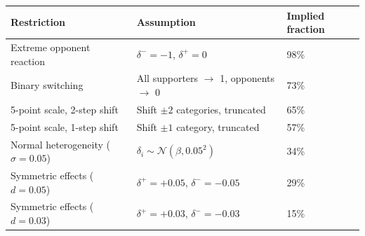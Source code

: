 \begin{tabular}{lll}
\toprule
Restriction & Assumption & Implied fraction \\
\midrule
Extreme opponent reaction & $\delta^- = -1$, $\delta^+ = 0$ & 98\% \\
Binary switching & All supporters $\to$ 1, opponents $\to$ 0 & 73\% \\
5-point scale, 2-step shift & Shift $\pm 2$ categories, truncated & 65\% \\
5-point scale, 1-step shift & Shift $\pm 1$ category, truncated & 57\% \\
Normal heterogeneity ($\sigma = 0.05$) & $\delta_i \sim \mathcal{N}(\beta, 0.05^2)$ & 34\% \\
Symmetric effects ($d = 0.05$) & $\delta^+ = +0.05$, $\delta^- = -0.05$ & 29\% \\
Symmetric effects ($d = 0.03$) & $\delta^+ = +0.03$, $\delta^- = -0.03$ & 15\% \\
\bottomrule
\end{tabular}
